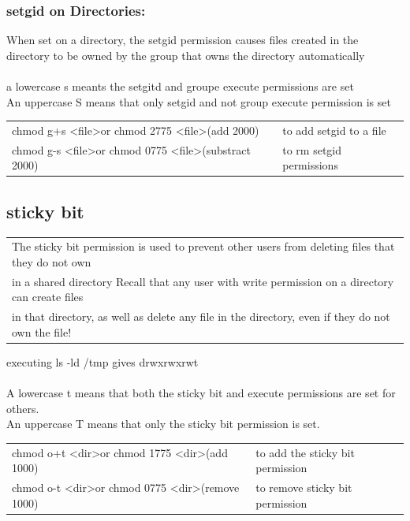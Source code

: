 \documentclass[10pt]{article}
\begin{document}
\subsubsection{setgid on Directories:}
When set on a directory, the setgid permission causes files created in the directory to be
owned by the group that owns the directory automatically\\\\
a lowercase s meants the setgitd and groupe execute permissions are set\\
An uppercase S means that only setgid and not group execute permission is set\\
\begin{center}
	\begin{tabular}{l l}
		chmod g+s \textless file\textgreater  or chmod 2775 \textless file\textgreater  (add 2000) & to add setgid to a file\\
		chmod g-s \textless file\textgreater  or chmod 0775 \textless file\textgreater  (substract 2000)& to rm setgid permissions\\
	\end{tabular}
\end{center}

\subsection{sticky bit}
\begin{center}
	\begin{tabular}{|l|}
		\hline
		The sticky bit permission is used to prevent other users from deleting files that they do not own\\
		in a shared directory Recall that any user with write permission on a directory can create files\\
		in that directory, as well as delete any file in the directory, even if they do not own the file!\\
		\hline
	\end{tabular}
\end{center}
executing ls -ld /tmp gives drwxrwxrwt\\\\
A lowercase t means that both the sticky bit and execute permissions are set for others.\\
An uppercase T means that only the sticky bit permission is set.\\
\begin{center}
	\begin{tabular}{l l}
		chmod o+t \textless dir\textgreater  or chmod 1775 \textless dir\textgreater  (add 1000) & to add the sticky bit permission\\
		chmod o-t \textless dir\textgreater  or chmod 0775 \textless dir\textgreater  (remove 1000)& to remove sticky bit permission\\
	\end{tabular}
\end{center}
\end{document}
